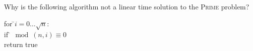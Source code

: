 Why is the following algorithm not a linear time solution to the
\textsc{Prime} problem?
\begin{tabbing}
for \=$i=0\ldots\sqrt n$:\\
\>if \=$\mod(n,i)\equiv0$\\
\>\>return true
\end{tabbing}
